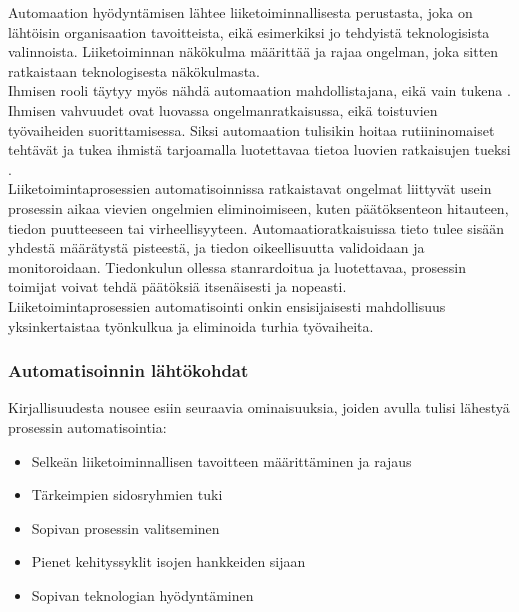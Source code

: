 \documentclass[finnish,12pt,a4paper,pdftex]{article}
\begin{document}
Automaation hyödyntämisen lähtee liiketoiminnallisesta perustasta, joka on lähtöisin organisaation tavoitteista, eikä esimerkiksi jo tehdyistä teknologisista valinnoista. Liiketoiminnan näkökulma määrittää ja rajaa ongelman, joka sitten ratkaistaan teknologisesta näkökulmasta. \citep{mohapatra}\\

\noindent Ihmisen rooli täytyy myös nähdä automaation mahdollistajana, eikä vain tukena \citep{mohapatra}. Ihmisen vahvuudet ovat luovassa ongelmanratkaisussa, eikä toistuvien työvaiheiden suorittamisessa. Siksi automaation tulisikin hoitaa rutiininomaiset tehtävät ja tukea ihmistä tarjoamalla luotettavaa tietoa luovien ratkaisujen tueksi \citep{leanit}.\\

\noindent Liiketoimintaprosessien automatisoinnissa ratkaistavat ongelmat liittyvät usein prosessin aikaa vievien ongelmien eliminoimiseen, kuten päätöksenteon hitauteen, tiedon puutteeseen tai virheellisyyteen. Automaatioratkaisuissa tieto tulee sisään yhdestä määrätystä pisteestä, ja tiedon oikeellisuutta validoidaan ja monitoroidaan. Tiedonkulun ollessa stanrardoitua ja luotettavaa, prosessin toimijat voivat tehdä päätöksiä itsenäisesti ja nopeasti. \citep{mohapatra}\\

\noindent Liiketoimintaprosessien automatisointi onkin ensisijaisesti mahdollisuus yksinkertaistaa työnkulkua ja eliminoida turhia työvaiheita. \citep{mohapatra}\\

\subsubsection{Automatisoinnin lähtökohdat}
 
Kirjallisuudesta nousee esiin seuraavia ominaisuuksia, joiden avulla tulisi lähestyä prosessin automatisointia:

\begin{itemize}
\setlength{\itemsep}{0pt}
    \item Selkeän liiketoiminnallisen tavoitteen määrittäminen ja rajaus
    \item Tärkeimpien sidosryhmien tuki
    \item Sopivan prosessin valitseminen
    \item Pienet kehityssyklit isojen hankkeiden sijaan
    \item Sopivan teknologian hyödyntäminen
\end{itemize}
\end{document}
